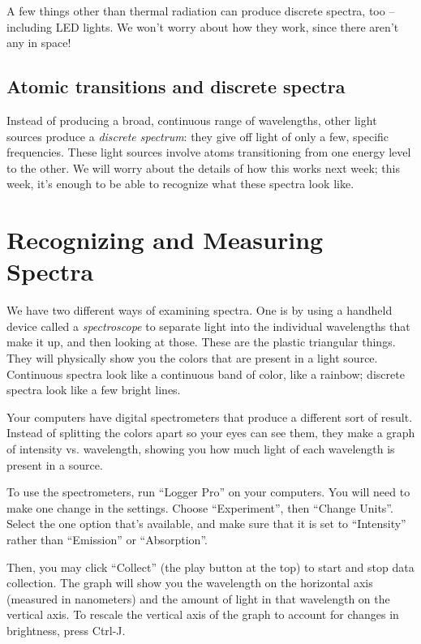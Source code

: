 \documentclass[11pt]{article}
\begin{document}
A few things other than thermal radiation can produce discrete spectra, too -- including LED lights. We won't worry about how they work, since there aren't any in space!

\subsection{Atomic transitions and discrete spectra}

Instead of producing a broad, continuous range of wavelengths, other light sources produce a {\it discrete spectrum}: they give off light
of only a few, specific frequencies. These light sources involve atoms transitioning from one energy level to the other. We will worry about the details of how this works next week; this week, it's enough to be able to recognize what these spectra look like.

\section{Recognizing and Measuring Spectra}

We have two different ways of examining spectra. One is by using a handheld device called a {\it spectroscope} to separate light into the individual wavelengths that make it up, and then looking at those. These are the plastic triangular things. They will physically show you 
the colors that are present in a light source. Continuous spectra look like a continuous band of color, like a rainbow; discrete spectra look like a few bright lines.

Your computers have digital spectrometers that produce a different sort of result. Instead of splitting the colors apart so your eyes can see them, they make a graph of intensity vs. wavelength, showing you how much light of each wavelength is present in a source.

To use the spectrometers, run ``Logger Pro'' on your computers. You will need to make one change in the settings. Choose ``Experiment'', then ``Change Units''. Select the one option that's available, and make sure that it is set to ``Intensity'' rather than ``Emission'' or ``Absorption''.

Then, you may click ``Collect'' (the play button at the top) to start and stop data collection. The graph will show you the wavelength on the horizontal axis (measured in nanometers) and the amount of light in that wavelength on the vertical axis. To rescale the vertical axis of the graph to account for changes in brightness, press Ctrl-J.
\end{document}
